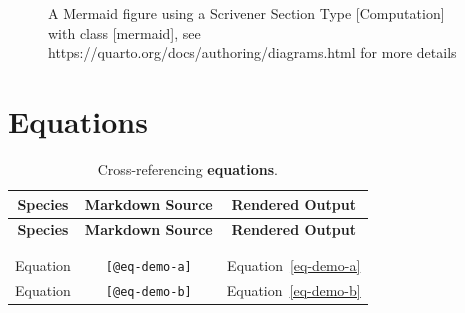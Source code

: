 \documentclass[
  10pt,
  oneside,
  cleardoublepage=empty,
  numbers=noenddot,
  titlepage,
  toclink=all,
  toc=bibliography,
  headinclude,
  footinclude]{scrbook}
\theoremstyle{plain}
\theoremstyle{plain}
\theoremstyle{definition}
\theoremstyle{definition}
\theoremstyle{plain}
\theoremstyle{plain}
\theoremstyle{definition}
\theoremstyle{plain}
\theoremstyle{remark}
\begin{document}
\begin{figure}


\caption{\label{fig-mermaid-c}A Mermaid figure using a Scrivener Section
Type {[}Computation{]} with class {[}mermaid{]}, see
https://quarto.org/docs/authoring/diagrams.html for more details}

\end{figure}%

\section{Equations}\label{equations}

\begin{longtable}[]{@{}ccc@{}}
\toprule\noalign{}
\textbf{Species} & \textbf{Markdown Source} & \textbf{Rendered
Output} \\
\midrule\noalign{}
\endfirsthead
\toprule\noalign{}
\textbf{Species} & \textbf{Markdown Source} & \textbf{Rendered
Output} \\
\midrule\noalign{}
\endhead
\bottomrule\noalign{}
\tabularnewline
\caption{Cross-referencing
\textbf{equations}.}\label{tbl-equations}\tabularnewline
\endlastfoot
Equation & \texttt{{[}@eq-demo-a{]}} &
\label{cite_49}{\label{cite_49}Equation~\ref{eq-demo-a}} \\
Equation & \texttt{{[}@eq-demo-b{]}} &
\label{cite_50}{\label{cite_50}Equation~\ref{eq-demo-b}} \\
\end{longtable}
\end{document}
